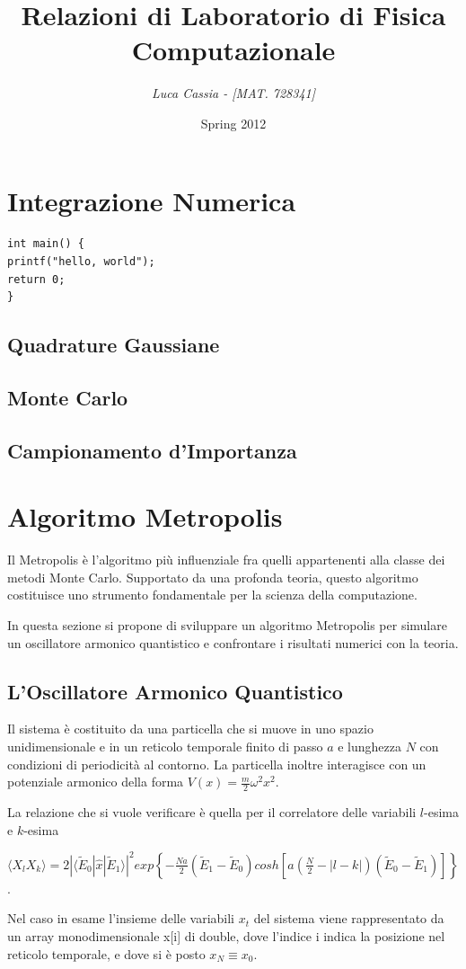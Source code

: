 \documentclass[a4paper,11pt]{report}
\title{\bfseries{\Huge{Relazioni di Laboratorio di Fisica Computazionale}}}
\author{\textit {Luca Cassia - [MAT. 728341]}}
\date{Spring 2012}
\begin{document}
\maketitle
\tableofcontents

\chapter{\huge Integrazione Numerica}

\begin{verbatim}
int main() {
printf("hello, world");
return 0;
}
\end{verbatim}

\section{Quadrature Gaussiane}
\section{Monte Carlo}
\section{Campionamento d'Importanza}

\chapter{\huge Algoritmo Metropolis}
Il Metropolis è l'algoritmo più influenziale fra quelli appartenenti alla classe dei metodi Monte Carlo. Supportato da una profonda teoria, questo algoritmo costituisce uno strumento fondamentale per la scienza della computazione.

In questa sezione si propone di sviluppare un algoritmo Metropolis per simulare un oscillatore armonico quantistico e confrontare i risultati numerici con la teoria.

\section{L'Oscillatore Armonico Quantistico}
Il sistema è costituito da una particella che si muove in uno spazio unidimensionale e in un reticolo temporale finito di passo $a$ e lunghezza $N$ con condizioni di periodicità al contorno. La particella inoltre interagisce con un potenziale armonico della forma $V(x) = \frac{m}{2}\omega^2 x^2$.

La relazione che si vuole verificare è quella per il correlatore delle variabili $l$-esima e $k$-esima
\begin{center}
\small
$\langle X_l X_k\rangle = 2|\langle\tilde{E}_0|\hat{x}|\tilde{E}_1\rangle|^2 exp\left\{-\frac{Na}{2}(\tilde{E}_1-\tilde{E}_0)cosh\left[a\left(\frac{N}{2}-|l-k|\right)(\tilde{E}_0-\tilde{E}_1)\right]\right\}$.
\end{center}
Nel caso in esame l'insieme delle variabili $x_t$ del sistema viene rappresentato da un array monodimensionale {\ttfamily x[i]} di {\ttfamily double}, dove l'indice {\ttfamily i} indica la posizione nel reticolo temporale, e dove si è posto $x_N \equiv x_0$.
\end{document}
